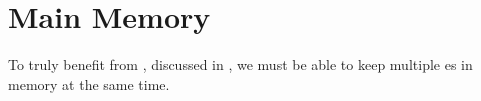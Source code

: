 \section{Main Memory}\label{sec:Main_Memory}
To truly benefit from , discussed in , we must be able to keep multiple es in memory at the same time.











